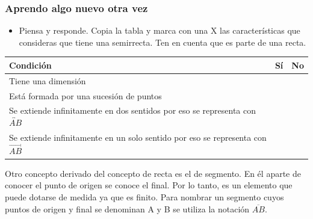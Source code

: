 \documentclass[10pt,twoside]{article}
\begin{document}
\subsubsection*{Aprendo algo nuevo otra vez}
\begin{itemize}
\item Piensa y responde. Copia la tabla y marca con una X las características que consideras que tiene una semirrecta. Ten en cuenta que es parte de una recta.
\end{itemize}
\begin{tabular}{|p{10cm}|l|l|}
\hline 
\textbf{Condición} & \textbf{Sí} & \textbf{No}\\ 
\hline 
Tiene una dimensi\'{o}n & & \\ 
\hline
Est\'{a} formada por una sucesi\'{o}n de puntos & & \\ 
\hline  
Se extiende infinitamente en dos sentidos por eso se representa con $\overleftrightarrow{AB}$ & &\rule[-0.3cm]{0cm}{0.8cm} \\ 
\hline 
Se extiende infinitamente en un solo sentido por eso se representa con $\overrightarrow{AB}$ & &\rule[-0.3cm]{0cm}{0.8cm}\\ 
\hline 
\end{tabular}

Otro concepto derivado del concepto de recta es el de segmento. En él aparte de
conocer el punto de origen se conoce el final. Por lo tanto, es un elemento que puede dotarse de medida ya que es finito. Para nombrar un segmento cuyos puntos de origen y final se denominan A y B se utiliza la notación $\overline{AB}$.
\end{document}
